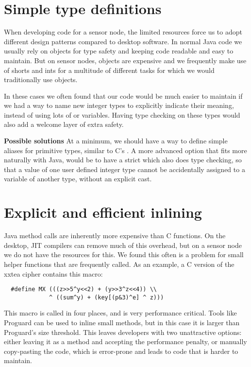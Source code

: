 \section{Simple type definitions}
\label{sec-typedef}
When developing code for a sensor node, the limited resources force us to adopt different design patterns compared to desktop software. In normal Java code we usually rely on objects for type safety and keeping code readable and easy to maintain. But on sensor nodes, objects are expensive and we frequently make use of shorts and ints for a multitude of different tasks for which we would traditionally use objects.

In these cases we often found that our code would be much easier to maintain if we had a way to name new integer types to explicitly indicate their meaning, instead of using lots of  or  variables. Having type checking on these types would also add a welcome layer of extra safety.

\textbf{Possible solutions}
At a minimum, we should have a way to define simple aliases for primitive types, similar to C's . A more advanced option that fits more naturally with Java, would be to have a strict  which also does type checking, so that a value of one user defined integer type cannot be accidentally assigned to a variable of another type, without an explicit cast.



\section{Explicit and efficient inlining}
\label{sec-inlining}
Java method calls are inherently more expensive than C functions. On the desktop, JIT compilers can remove much of this overhead, but on a sensor node we do not have the resources for this. We found this often is a problem for small helper functions that are frequently called. As an example, a C version of the xxtea cipher \cite{Wheeler:1998} contains this macro: 
\begin{verbatim}
  #define MX (((z>>5^y<<2) + (y>>3^z<<4)) \\
             ^ ((sum^y) + (key[(p&3)^e] ^ z)))
\end{verbatim}

This macro is called in four places, and is very performance critical. Tools like Proguard \cite{proguard} can be used to inline small methods, but in this case it is larger than Proguard's size threshold. This leaves developers with two unattractive options: either leaving it as a method and accepting the performance penalty, or manually copy-pasting the code, which is error-prone and leads to code that is harder to maintain.

